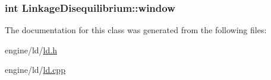 \label{classLinkageDisequilibrium_ac3844fe848ba87fe5d26e12d7c6f20d8}
\hypertarget{classLinkageDisequilibrium_af2487209d065ab6f7286beb76bc6b239}{
\subsubsection[{window}]{\setlength{\rightskip}{0pt plus 5cm}int {\bf LinkageDisequilibrium::window}}}
\label{classLinkageDisequilibrium_af2487209d065ab6f7286beb76bc6b239}


The documentation for this class was generated from the following files:\begin{DoxyCompactItemize}
\item 
engine/ld/\hyperlink{ld_8h}{ld.h}\item 
engine/ld/\hyperlink{ld_8cpp}{ld.cpp}\end{DoxyCompactItemize}
